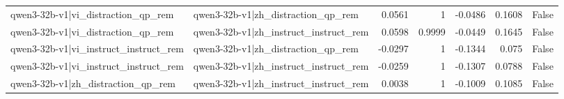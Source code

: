 \begin{table}
\begin{tabular}{l l r r r r l}
qwen3-32b-v1|vi_distraction_qp_rem & qwen3-32b-v1|zh_distraction_qp_rem & 0.0561 & 1 & -0.0486 & 0.1608 & False \\
qwen3-32b-v1|vi_distraction_qp_rem & qwen3-32b-v1|zh_instruct_instruct_rem & 0.0598 & 0.9999 & -0.0449 & 0.1645 & False \\
qwen3-32b-v1|vi_instruct_instruct_rem & qwen3-32b-v1|zh_distraction_qp_rem & -0.0297 & 1 & -0.1344 & 0.075 & False \\
qwen3-32b-v1|vi_instruct_instruct_rem & qwen3-32b-v1|zh_instruct_instruct_rem & -0.0259 & 1 & -0.1307 & 0.0788 & False \\
qwen3-32b-v1|zh_distraction_qp_rem & qwen3-32b-v1|zh_instruct_instruct_rem & 0.0038 & 1 & -0.1009 & 0.1085 & False \\
\bottomrule
\end{tabular}
\end{table}
